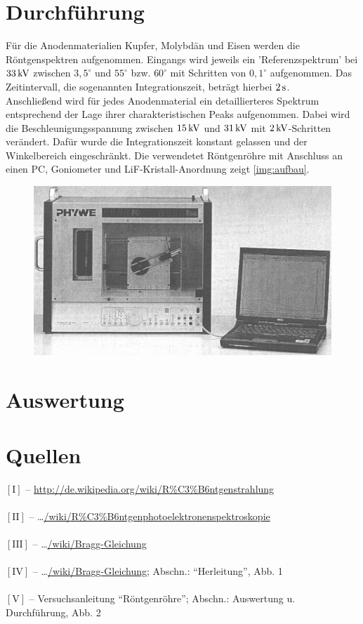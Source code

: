 \documentclass[numbers=noenddot,12pt,a4paper]{scrartcl}
\newcommand{\num}[1]{$\left[\text{#1}\right]$}
\newcommand{\degree}{^\circ}
\begin{document}
\section{Durchführung}
Für die Anodenmaterialien Kupfer, Molybdän und Eisen werden die Röntgenspektren aufgenommen. Eingangs wird jeweils ein 'Referenzspektrum' bei $\unit[33]{kV}$ zwischen $3,5\degree$ und $55\degree$ bzw. $60\degree$ mit Schritten von $0,1\degree$ aufgenommen. Das Zeitintervall, die sogenannten Integrationszeit, beträgt hierbei $\unit[2]{s}$.\\
Anschließend wird für jedes Anodenmaterial ein detaillierteres Spektrum entsprechend der Lage ihrer charakteristischen Peaks aufgenommen. Dabei wird die Beschleunigungsspannung zwischen $\unit[15]{kV}$ und $\unit[31]{kV}$ mit $\unit[2]{kV}$-Schritten verändert. Dafür wurde die Integrationszeit konstant gelassen und der Winkelbereich eingeschränkt. Die verwendetet Röntgenröhre mit Anschluss an einen PC, Goniometer und LiF-Kristall-Anordnung zeigt \ref{img:aufbau}.
\begin{figure}[H]
	\centering
	\includegraphics[width=\textwidth]{aufbau.png}
\end{figure}
\newpage
\section{Auswertung}
\section{Quellen}
	\num{I} -- \url{http://de.wikipedia.org/wiki/R%C3%B6ntgenstrahlung}\\ \\
	\num{II} -- \dots\url{/wiki/R%C3%B6ntgenphotoelektronenspektroskopie}\\ \\
	\num{III} -- \dots\url{/wiki/Bragg-Gleichung}\\ \\
	\num{IV} -- \dots\url{/wiki/Bragg-Gleichung}; Abschn.: "`Herleitung"', Abb. 1 \\ \\
	\num{V} -- Versuchsanleitung "`Röntgenröhre"'; Abschn.: Auswertung u. Durchführung, Abb. 2
\end{document}
